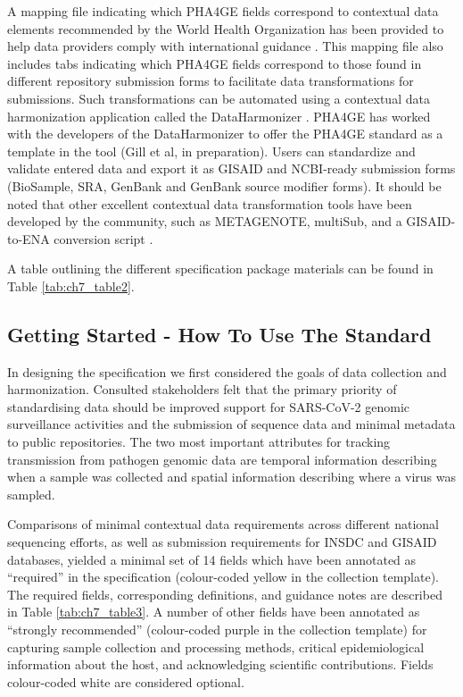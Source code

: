 A mapping file indicating which PHA4GE fields correspond to contextual data elements recommended by the World Health Organization has been provided to help data providers comply with international guidance \cite{world_health_organization_guidance_nodate}. This mapping file also includes tabs indicating which PHA4GE fields correspond to those found in different repository submission forms to facilitate data transformations for submissions. Such transformations can be automated using a contextual data harmonization application called the DataHarmonizer \cite{hsiao_public_health_bioinformatics_lab_dataharmonizer_2022}. PHA4GE has worked with the developers of the DataHarmonizer to offer the PHA4GE standard as a template in the tool (Gill et al, in preparation). Users can standardize and validate entered data and export it as GISAID and NCBI-ready submission forms (BioSample, SRA, GenBank and GenBank source modifier forms). It should be noted that other excellent contextual data transformation tools have been developed by the community, such as METAGENOTE, multiSub, and a GISAID-to-ENA conversion script \cite{noauthor_metagenote_nodate, haeussler_multisub_2022, noauthor_ena-content-dataflowscriptsgisaid_to_ena_nodate}.

A table outlining the different specification package materials can be found in Table \ref{tab:ch7_table2}.



\subsection{Getting Started - How To Use The Standard}

In designing the specification we first considered the goals of data collection and harmonization. Consulted stakeholders felt that the primary priority of standardising data should be improved support for SARS-CoV-2 genomic surveillance activities and the submission of sequence data and minimal metadata to public repositories. The two most important attributes for tracking transmission from pathogen genomic data are temporal information describing when a sample was collected and spatial information describing where a virus was sampled.

Comparisons of minimal contextual data requirements across different national sequencing efforts, as well as submission requirements for INSDC and GISAID databases, yielded a minimal set of 14 fields which have been annotated as “required” in the specification (colour-coded yellow in the collection template). The required fields, corresponding definitions, and guidance notes are described in Table \ref{tab:ch7_table3}. A number of other fields have been annotated as “strongly recommended” (colour-coded purple in the collection template) for capturing sample collection and processing methods, critical epidemiological information about the host, and acknowledging scientific contributions. Fields colour-coded white are considered optional. 

